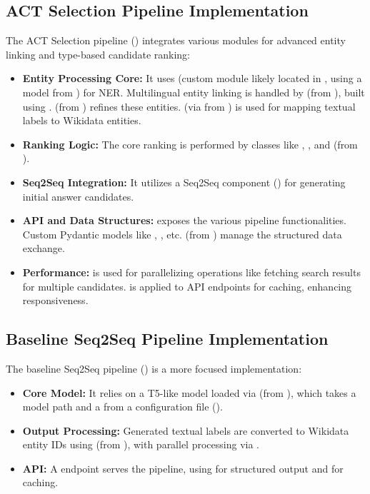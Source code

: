\subsection{ACT Selection Pipeline Implementation}
The ACT Selection pipeline () integrates various modules for advanced entity linking and type-based candidate ranking:
\begin{itemize}
    \item \textbf{Entity Processing Core:} It uses  (custom module likely located in , using a model from ) for NER. Multilingual entity linking is handled by  (from ), built using .  (from ) refines these entities.  (via  from ) is used for mapping textual labels to Wikidata entities.
    \item \textbf{Ranking Logic:} The core ranking is performed by classes like , , and  (from ).
    \item \textbf{Seq2Seq Integration:} It utilizes a Seq2Seq component () for generating initial answer candidates.
    \item \textbf{API and Data Structures:}  exposes the various pipeline functionalities. Custom Pydantic models like , , etc. (from ) manage the structured data exchange.
    \item \textbf{Performance:}  is used for parallelizing operations like fetching search results for multiple candidates.  is applied to API endpoints for caching, enhancing responsiveness.
\end{itemize}

\subsection{Baseline Seq2Seq Pipeline Implementation}
The baseline Seq2Seq pipeline () is a more focused implementation:
\begin{itemize}
    \item \textbf{Core Model:} It relies on a T5-like model loaded via  (from ), which takes a model path and a  from a configuration file ().
    \item \textbf{Output Processing:} Generated textual labels are converted to Wikidata entity IDs using  (from ), with parallel processing via .
    \item \textbf{API:} A  endpoint serves the pipeline, using  for structured output and  for caching.
\end{itemize}

